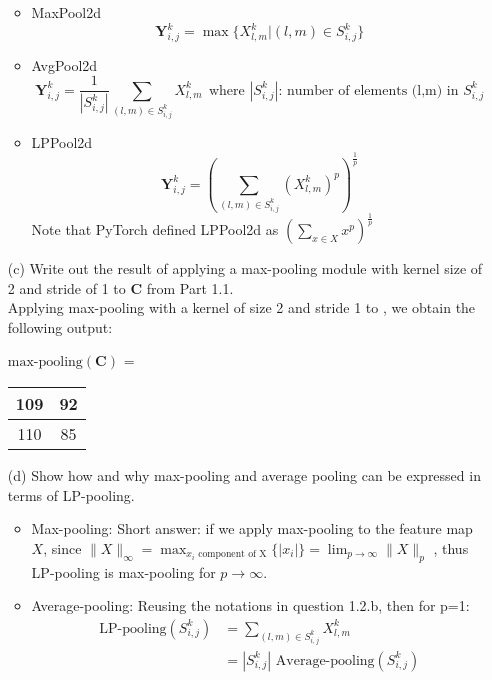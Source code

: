 \documentclass[11pt]{article}
\newcommand{\0}{\mat{0}}
\newcommand{\matr}[1]{\bm{#1}}     %
\begin{document}
\begin{itemize}
	\begin{itemize}
		\item MaxPool2d
		\[
			\matr{Y}^k_{i,j} = \max \{ X^k_{l,m}| (l,m) \in  S^{k}_{i,j} \}
		\]
		\item AvgPool2d
		\[
			\matr{Y}^k_{i,j} = \frac{1}{|  S^{k}_{i,j} |} \sum_{(l,m) \in  S^{k}_{i,j}} X^k_{l,m} ~~  \text{where } |  S^{k}_{i,j} | \text{: number of elements (l,m) in } S^{k}_{i,j}
		\]	
		\item LPPool2d
		\[
			\matr{Y}^k_{i,j} =   (\sum_{(l,m) \in  S^{k}_{i,j}} (X^k_{l,m})^p)^{\frac{1}{p}}
		\]	
		Note that PyTorch defined LPPool2d as $(\sum_{x \in X} x^p)^{\frac{1}{p}}$
		
	\end{itemize}
        
    
    \item[(c)] Write out the result of applying a max-pooling module with kernel size of 2 and stride of 1 to $\matr{C}$ from Part 1.1.\\
    \smallskip
    Applying max-pooling with a kernel of size 2 and stride 1 to , we obtain the following output:
    
    	    \begin{table}[!ht]
		    \centering
    		$\text{max-pooling} (\matr{C})$ = \begin{tabular}{|c|c|} 
    			\hline
			109 & 92 \\ \hline 
		        110 & 85 \\ \hline
   		 \end{tabular}
    	  \end{table}

    
    \item[(d)] Show how and why max-pooling and average pooling can be expressed in terms of LP-pooling.\\
    \smallskip
    	\begin{itemize}
		\item Max-pooling:
		    Short answer: if we apply max-pooling to the feature map $X$, 
    		    since $ \|X\|_{\infty}  = \max_{x_i \text{ component of X}}  \{ |x_i| \} = \lim_{p \to \infty} \|X\|_p$ , thus LP-pooling is max-pooling for $p \to \infty$.
		\item Average-pooling:
		Reusing the notations in question 1.2.b, then for p=1:
		\begin{align*}
			\text{LP-pooling} (S^k_{i,j})  &=  \sum_{(l,m) \in  S^{k}_{i,j}} X^k_{l,m} \\
						&= |  S^{k}_{i,j} | \text{ Average-pooling}(S^k_{i,j})
		\end{align*}
		   
 	\end{itemize}   
\end{itemize}
\end{document}
